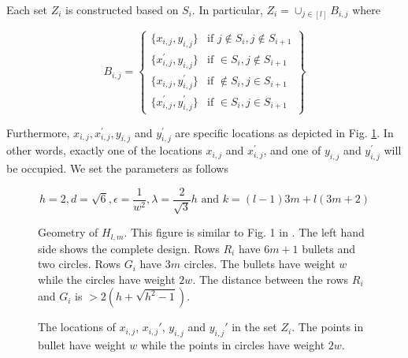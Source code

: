 \documentclass{article}
\begin{document}
Each set $Z_i$ is constructed based on $S_i$. In particular, $Z_i = \cup_{j\in [l]} B_{i,j}$ where 

$$ B_{i,j} = \left\{
	\begin{array}{ll}
		\{ x_{i, j}, y_{i,j} \}  &              \mbox{if } j\notin S_i,j\notin S_{i+1} \\
		\{ x_{i, j}^\prime, y_{i,j} \}  &       \mbox{if } \in S_i,j\notin S_{i+1} \\
		\{ x_{i, j}, y_{i,j}^\prime \}  &       \mbox{if } \notin S_i,j\in S_{i+1} \\
		\{ x_{i, j}^\prime, y_{i,j}^\prime \} & \mbox{if } \in S_i,j\in S_{i+1}	
        \end{array}
\right\}$$

Furthermore, $x_{i, j}, x_{i,j}^\prime, y_{i,j}$ and $y_{i, j}^\prime$ are specific locations as depicted in Fig. \ref{fig:ZFig}. In other words, exactly one of the locations $x_{i,j}$ and $x_{i,j}^\prime$, and one of $y_{i,j}$ and $y_{i,j}^\prime$ will be occupied. We set the parameters as follows

$$h = 2, d = \sqrt{6}, \epsilon = \frac{1}{w^2}, \lambda = \frac{2}{\sqrt{3}}h \text{ and }k = (l-1)3m + l(3m+2)$$



  \begin{figure}[!tbp]
  \centering
  \begin{minipage}[b]{0.49\textwidth}
    \resizebox{\linewidth}{!}{}
    \caption{Geometry of $H_{l,m}$. This figure is similar to Fig. 1 in \cite{vattani2009hardness}. The left hand side shows the complete design. Rows $R_i$ have $6m+1$ bullets and two circles. Rows $G_i$ have $3m$ circles. The bullets have weight $w$ while the circles have weight $2w$. The distance between the rows $R_i$ and $G_i$ is $> 2(h+\sqrt{h^2-1})$.}
    \label{fig:lowerBoundComponent}
  \end{minipage}
  \hfill
  \begin{minipage}[b]{0.49\textwidth}
    
    \caption{The locations of $x_{i,j}$, $x_{i,j}'$, $y_{i,j}$ and $y_{i,j}'$ in the set $Z_i$. The points in bullet have weight $w$ while the points in circles have weight $2w$.}
    \label{fig:ZFig}
  \end{minipage}
\end{figure}
  
\end{document}
